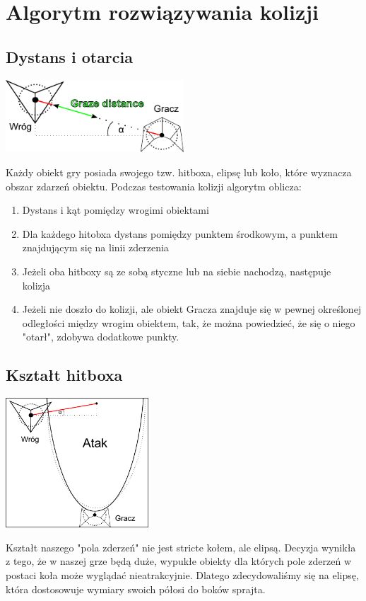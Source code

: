 \documentclass[a4paper,twoside]{article}
\begin{document}
	
		\section{Algorytm rozwiązywania kolizji}
			\subsection{Dystans i otarcia}
				\begin{center}
					\includegraphics[width=0.5\textwidth]{./images/kolizje01}
				\end{center}
				Każdy obiekt gry posiada swojego tzw. hitboxa, elipsę lub koło, które wyznacza obszar zdarzeń obiektu. Podczas testowania kolizji algorytm oblicza:
				\begin{enumerate}
					\item Dystans i kąt pomiędzy wrogimi obiektami
					\item Dla każdego hitobxa dystans pomiędzy punktem środkowym, a punktem znajdującym się na linii zderzenia
					\item Jeżeli oba hitboxy są ze sobą styczne lub na siebie nachodzą, następuje kolizja
					\item Jeżeli nie doszło do kolizji, ale obiekt Gracza znajduje się w pewnej określonej odległości między wrogim obiektem, tak, że można powiedzieć, że się o niego "otarł", zdobywa dodatkowe punkty.
				\end{enumerate}
			\subsection{Kształt hitboxa}
				\begin{center}
					\includegraphics[width=0.4\textwidth]{./images/hitbox01}
				\end{center}
				Kształt naszego "pola zderzeń" nie jest stricte kołem, ale elipsą. Decyzja wynikła z tego, że w naszej grze będą duże, wypukłe obiekty dla których pole zderzeń w postaci koła może wyglądać nieatrakcyjnie. Dlatego zdecydowaliśmy się na elipsę, która dostosowuje wymiary swoich półosi do boków sprajta.
	
\end{document}
